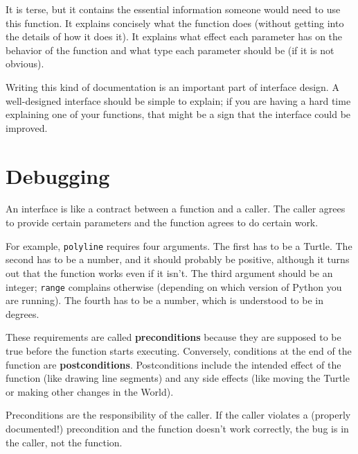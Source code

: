 \documentclass[10pt]{book}
\begin{document}

It is terse, but it contains the essential information
someone would need to use this function.  It explains concisely what
the function does (without getting into the details of how it does
it).  It explains what effect each parameter has on the behavior of
the function and what type each parameter should be (if it is not
obvious).

Writing this kind of documentation is an important part of interface
design.  A well-designed interface should be simple to explain;
if you are having a hard time explaining one of your functions,
that might be a sign that the interface could be improved.


\section{Debugging}

An interface is like a contract between a function and a caller.
The caller agrees to provide certain parameters and the function
agrees to do certain work.

For example, {\tt polyline} requires four arguments.  The first
has to be a Turtle.  The second has to be a number, and it should
probably be positive, although it turns out that the function
works even if it isn't.  The third argument should be an integer;
{\tt range} complains otherwise (depending on which version
of Python you are running).  The fourth has to be a number,
which is understood to be in degrees.

These requirements are called {\bf preconditions} because they
are supposed to be true before the function starts executing.
Conversely, conditions at the end of the function are
{\bf postconditions}.  Postconditions include the intended
effect of the function (like drawing line segments) and any
side effects (like moving the Turtle or making other changes
in the World).


Preconditions are the responsibility of the caller.  If the caller
violates a (properly documented!) precondition and the function
doesn't work correctly, the bug is in the caller, not the function.

\end{document}
